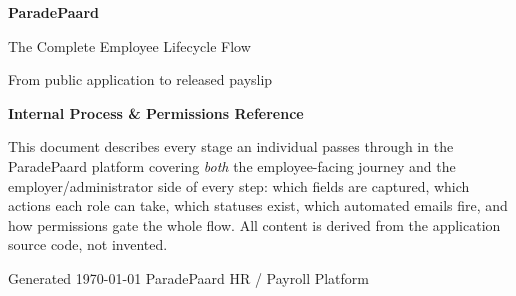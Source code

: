 \documentclass[11pt,a4paper]{article}
\begin{document}
\begin{titlepage}
\centering
\vspace*{2.2cm}
{\Huge\bfseries\textcolor{ppblue}{ParadePaard}\par}
\vspace{0.4cm}
{\LARGE The Complete Employee Lifecycle Flow\par}
\vspace{0.3cm}
{\large From public application to released payslip\par}
\vspace{1.4cm}


\vspace{1.6cm}
{\large\bfseries Internal Process \& Permissions Reference\par}
\vspace{0.6cm}
\begin{minipage}{0.8\textwidth}
\centering\small
This document describes every stage an individual passes through in the
ParadePaard platform \textemdash{} covering \emph{both} the employee-facing journey and
the employer/administrator side of every step: which fields are captured,
which actions each role can take, which statuses exist, which automated
emails fire, and how permissions gate the whole flow. All content is derived
from the application source code, not invented.
\end{minipage}

\vfill
{\small Generated \today{} \quad\textbullet\quad ParadePaard HR / Payroll Platform\par}
\end{titlepage}

\tableofcontents
\thispagestyle{fancy}
\clearpage

\end{document}
